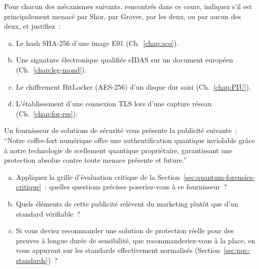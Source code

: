 \bigskip

\begin{boxexo}[title={\ding{45}\quad Exercice~25.1 --- Distinguer les menaces \niveaubase}]
Pour chacun des mécanismes suivants, rencontrés dans ce cours,
indiquez s'il est principalement menacé par Shor, par Grover,
par les deux, ou par aucun des deux, et justifiez~:
\begin{enumerate}[(a)]
    \item Le hash SHA-256 d'une image E01 (Ch.~\ref{chap:acq}).
    \item Une signature électronique qualifiée eIDAS sur un
          document européen (Ch.~\ref{chap:leg-mond}).
    \item Le chiffrement BitLocker (AES-256) d'un disque dur
          saisi (Ch.~\ref{chap:PIU}).
    \item L'établissement d'une connexion TLS lors d'une capture
          réseau (Ch.~\ref{chap:for-res}).
\end{enumerate}
\end{boxexo}

\begin{boxexo}[title={\ding{45}\quad Exercice~25.2 --- Esprit critique appliqué \niveaumoyen}]
Un fournisseur de solutions de sécurité vous présente la publicité
suivante~: ``Notre coffre-fort numérique offre une authentification
quantique inviolable grâce à notre technologie de scellement
quantique propriétaire, garantissant une protection absolue
contre toute menace présente et future.''
\begin{enumerate}[(a)]
    \item Appliquez la grille d'évaluation critique de la
          Section~\ref{sec:quantum-forensics-critique}~: quelles
          questions précises poseriez-vous à ce fournisseur~?
    \item Quels éléments de cette publicité relèvent du marketing
          plutôt que d'un standard vérifiable~?
    \item Si vous deviez recommander une solution de protection
          réelle pour des preuves à longue durée de sensibilité,
          que recommanderiez-vous à la place, en vous appuyant
          sur les standards effectivement normalisés
          (Section~\ref{sec:pqc-standards})~?
\end{enumerate}
\end{boxexo}

